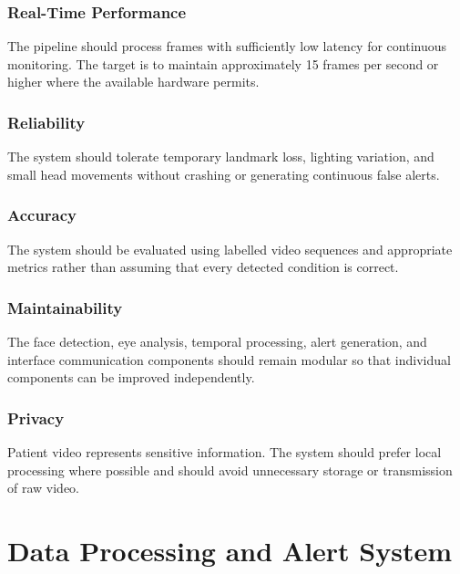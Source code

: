 \documentclass[12pt]{tietreport}
\begin{document}
\subsection{Real-Time Performance}

The pipeline should process frames with sufficiently low latency for
continuous monitoring. The target is to maintain approximately
15 frames per second or higher where the available hardware permits.

\subsection{Reliability}

The system should tolerate temporary landmark loss, lighting
variation, and small head movements without crashing or generating
continuous false alerts.

\subsection{Accuracy}

The system should be evaluated using labelled video sequences and
appropriate metrics rather than assuming that every detected
condition is correct.

\subsection{Maintainability}

The face detection, eye analysis, temporal processing, alert
generation, and interface communication components should remain
modular so that individual components can be improved independently.

\subsection{Privacy}

Patient video represents sensitive information. The system should
prefer local processing where possible and should avoid unnecessary
storage or transmission of raw video.


\chapter{Data Processing and Alert System}
\end{document}
